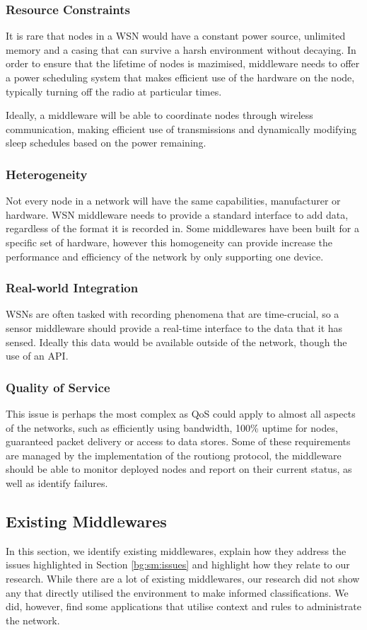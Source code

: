 	\subsubsection{Resource Constraints}
		It is rare that nodes in a WSN would have a constant power source, unlimited memory and a casing that can survive a harsh environment without decaying. In order to ensure that the lifetime of nodes is mazimised, middleware needs to offer a power scheduling system that makes efficient use of the hardware on the node, typically turning off the radio at particular times.

		Ideally, a middleware will be able to coordinate nodes through wireless communication, making efficient use of transmissions and dynamically modifying sleep schedules based on the power remaining.
	\subsubsection{Heterogeneity}
		Not every node in a network will have the same capabilities, manufacturer or hardware. WSN middleware needs to provide a standard interface to add data, regardless of the format it is recorded in. Some middlewares have been built for a specific set of hardware, however this homogeneity can provide increase the performance and efficiency of the network by only supporting one device.
	\subsubsection{Real-world Integration}
		WSNs are often tasked with recording phenomena that are time-crucial, so a sensor middleware should provide a real-time interface to the data that it has sensed. Ideally this data would be available outside of the network, though the use of an API.
	\subsubsection{Quality of Service}
		This issue is perhaps the most complex as QoS could apply to almost all aspects of the networks, such as efficiently using bandwidth, 100\% uptime for nodes, guaranteed packet delivery or access to data stores. Some of these requirements are managed by the implementation of the routiong protocol, the middleware should be able to monitor deployed nodes and report on their current status, as well as identify failures.

\subsection{Existing Middlewares}\label{sec:middleware}
	In this section, we identify existing middlewares, explain how they address the issues highlighted in Section \ref{bg:sm:issues} and highlight how they relate to our research. While there are a lot of existing middlewares, our research did not show any that directly utilised the environment to make informed classifications. We did, however, find some applications that utilise context and rules to administrate the network.

